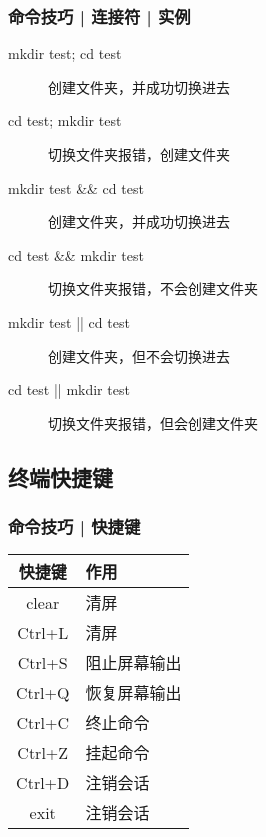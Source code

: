 \begin{frame}[fragile]
  \frametitle{命令技巧 | 连接符 | 实例}
  \begin{description}
     \item[mkdir test; cd test] 创建文件夹，并成功切换进去
     \item[cd test; mkdir test] 切换文件夹报错，创建文件夹
     \item[mkdir test \&\& cd test] 创建文件夹，并成功切换进去
     \item[cd test \&\& mkdir test] 切换文件夹报错，不会创建文件夹
     \item[mkdir test || cd test] 创建文件夹，但不会切换进去
     \item[cd test || mkdir test] 切换文件夹报错，但会创建文件夹
  \end{description}
\end{frame}

\subsection{终端快捷键}
\begin{frame}
  \frametitle{命令技巧 | 快捷键}
  \begin{table}
    \centering
    \begin{tabularx}{0.4\textwidth}{cX}
      \hline
      \rowcolor{blue!50}快捷键 & 作用\\
      \hline
      clear & 清屏\\
      \alert{Ctrl+L} & 清屏\\
      \hline
      Ctrl+S & 阻止屏幕输出\\
      Ctrl+Q & 恢复屏幕输出\\
      \hline
      \alert{Ctrl+C} & 终止命令\\
      \alert{Ctrl+Z} & 挂起命令\\
      \hline
      \alert{Ctrl+D} & 注销会话\\
      exit & 注销会话\\
      \hline
    \end{tabularx}
  \end{table}
\end{frame}

